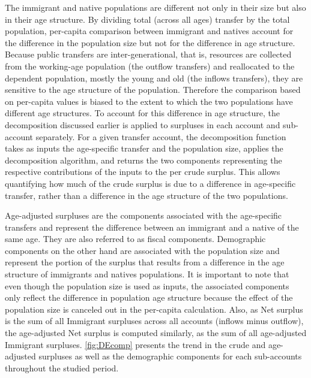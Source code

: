 The immigrant and native populations are different not only in their size but also in their age structure.
By dividing total (across all ages) transfer by the total population, per-capita comparison between immigrant and natives account for the difference in the population size but not for the difference in age structure.
Because public transfers are inter-generational, that is, resources are collected from the working-age population (the outflow transfers) and reallocated to the dependent population, mostly the young and old (the inflows transfers), they are sensitive to the age structure of the population.
Therefore the comparison based on per-capita values is biased to the extent to which the two populations have different age structures.
To account for this difference in age structure, the decomposition discussed earlier is applied to surpluses in each account and sub-account separately.
For a given transfer account, the decomposition function takes as inputs the age-specific transfer and the population size, applies the decomposition algorithm, and returns the two components representing the respective contributions of the inputs to the per crude surplus.
This allows quantifying how much of the crude surplus is due to a difference in age-specific transfer, rather than a  difference in the age structure of the two populations.

\vspace{0.7em}\par
Age-adjusted surpluses are the components associated with the age-specific transfers and represent the difference between an immigrant and a native of the same age.
They are also referred to as fiscal components.
Demographic components on the other hand are associated with the population size and represent the portion of the surplus that results from a difference in the age structure of immigrants and natives populations.
It is important to note that even though the population size is used as inputs, the associated components only reflect the difference in population age structure because the effect of the population size is canceled out in the per-capita calculation.
Also, as Net surplus is the sum of all Immigrant surpluses across all accounts (inflows minus outflow), the age-adjusted Net surplus is computed similarly, as the sum of all age-adjusted Immigrant surpluses. \autoref{fig:DEcomp} presents the trend in the crude and age-adjusted surpluses as well as the demographic components for each sub-accounts throughout the studied period.

